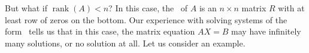 
But what if $\operatorname{rank}(A)<n$? In this case, the \rref\ of $A$ is an $n\times n$ matrix $R$ with at least row of zeros on the bottom. Our experience with solving systems of the form \ttaxb\ tells us that in this case, the matrix equation $AX=B$ may have infinitely many solutions, or no solution at all. Let us consider an example.

\medskip

